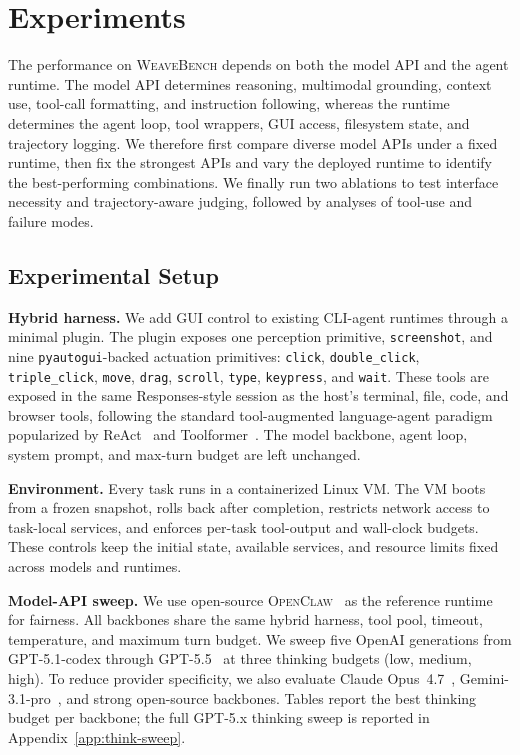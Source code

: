 \section{Experiments}
\label{sec:experiments}

The performance on \textsc{WeaveBench} depends on both the model API and the agent runtime. The model API determines reasoning, multimodal grounding, context use, tool-call formatting, and instruction following, whereas the runtime determines the agent loop, tool wrappers, GUI access, filesystem state, and trajectory logging. We therefore first compare diverse model APIs under a fixed runtime, then fix the strongest APIs and vary the deployed runtime to identify the best-performing combinations. We finally run two ablations to test interface necessity and trajectory-aware judging, followed by analyses of tool-use and failure modes.

\subsection{Experimental Setup}
\label{sec:experimental-setup}

\noindent\textbf{Hybrid harness.}\label{sec:protocol-runtime}
We add GUI control to existing CLI-agent runtimes through a minimal plugin. The plugin exposes one perception primitive, \texttt{screenshot}, and nine \texttt{pyautogui}-backed actuation primitives: \texttt{click}, \texttt{double\_click}, \texttt{triple\_click}, \texttt{move}, \texttt{drag}, \texttt{scroll}, \texttt{type}, \texttt{keypress}, and \texttt{wait}. These tools are exposed in the same Responses-style session as the host's terminal, file, code, and browser tools, following the standard tool-augmented language-agent paradigm popularized by ReAct~\citep{yao2022react} and Toolformer~\citep{schick2023toolformer}. The model backbone, agent loop, system prompt, and max-turn budget are left unchanged.

\smallskip
\noindent\textbf{Environment.}
Every task runs in a containerized Linux VM. The VM boots from a frozen snapshot, rolls back after completion, restricts network access to task-local services, and enforces per-task tool-output and wall-clock budgets. These controls keep the initial state, available services, and resource limits fixed across models and runtimes.

\smallskip
\noindent\textbf{Model-API sweep.}
We use open-source \textsc{OpenClaw}~\citep{openclaw2025} as the reference runtime for fairness. All backbones share the same hybrid harness, tool pool, timeout, temperature, and maximum turn budget. We sweep five OpenAI generations from GPT-5.1-codex through GPT-5.5~\citep{openai2026gpt55} at three thinking budgets (low, medium, high). To reduce provider specificity, we also evaluate Claude Opus~4.7~\citep{anthropic2026opus47}, Gemini-3.1-pro~\citep{google2026gemini31pro}, and strong open-source backbones. Tables report the best thinking budget per backbone; the full GPT-5.x thinking sweep is reported in Appendix~\ref{app:think-sweep}.


